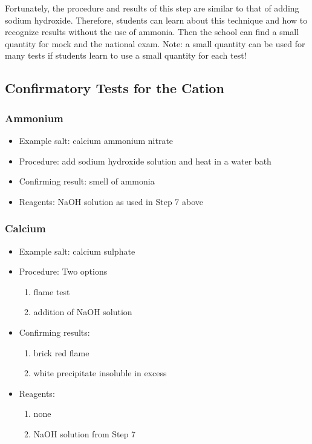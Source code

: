 Fortunately, 
the procedure and results of this step are similar 
to that of adding sodium hydroxide. 
Therefore, 
students can learn about this technique 
and how to recognize results without the use of ammonia. 
Then the school can find a small quantity for mock and the national exam.
Note: a small quantity can be used for many tests 
if students learn to use a small quantity for each test!

\subsection{Confirmatory Tests for the Cation}

\subsubsection{Ammonium}
\begin{itemize}
\item{Example salt: calcium ammonium nitrate}
\item{Procedure: add sodium hydroxide solution and heat in a water bath}
\item{Confirming result: smell of ammonia} 
\item{Reagents: NaOH solution as used in Step 7 above}
\end{itemize}

\subsubsection{Calcium}
\begin{itemize}
\item{Example salt: calcium sulphate}

\item{Procedure: Two options
\begin{enumerate}
\item{flame test}
\item{addition of NaOH solution}
\end{enumerate}
} %

\item{Confirming results:
\begin{enumerate}
\item{brick red flame}
\item{white precipitate insoluble in excess}
\end{enumerate}
} %

\item{Reagents:
\begin{enumerate}
\item{none}
\item{NaOH solution from Step 7}
\end{enumerate}
} %

\end{itemize} %

